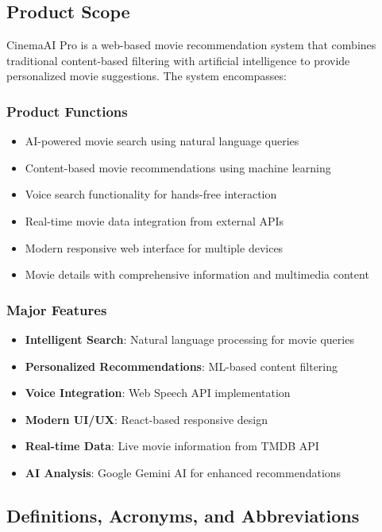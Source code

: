 \documentclass[12pt,a4paper]{article}
\begin{document}
\subsection{Product Scope}
CinemaAI Pro is a web-based movie recommendation system that combines traditional content-based filtering with artificial intelligence to provide personalized movie suggestions. The system encompasses:

\subsubsection{Product Functions}
\begin{itemize}
    \item AI-powered movie search using natural language queries
    \item Content-based movie recommendations using machine learning
    \item Voice search functionality for hands-free interaction
    \item Real-time movie data integration from external APIs
    \item Modern responsive web interface for multiple devices
    \item Movie details with comprehensive information and multimedia content
\end{itemize}

\subsubsection{Major Features}
\begin{itemize}
    \item \textbf{Intelligent Search}: Natural language processing for movie queries
    \item \textbf{Personalized Recommendations}: ML-based content filtering
    \item \textbf{Voice Integration}: Web Speech API implementation
    \item \textbf{Modern UI/UX}: React-based responsive design
    \item \textbf{Real-time Data}: Live movie information from TMDB API
    \item \textbf{AI Analysis}: Google Gemini AI for enhanced recommendations
\end{itemize}

\subsection{Definitions, Acronyms, and Abbreviations}
\end{document}
